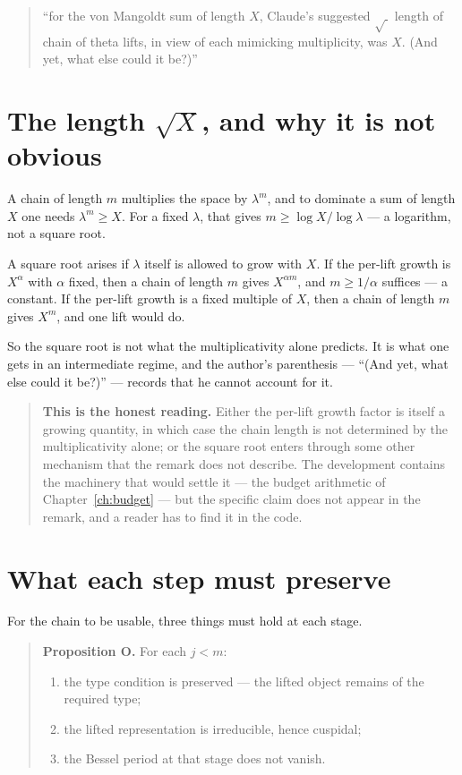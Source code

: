 \begin{quote}
\small
``for the von Mangoldt sum of length $X$, Claude's suggested $\sqrt{\ }$
length of chain of theta lifts, in view of each mimicking multiplicity, was
$X$. (And yet, what else could it be?)''
\end{quote}

\section{The length \texorpdfstring{$\sqrt{X}$}{sqrt of X}, and why it is not obvious}A chain of length $m$ multiplies the space by $\lambda^m$, and to dominate a
sum of length $X$ one needs $\lambda^m \ge X$. For a fixed $\lambda$, that
gives $m \ge \log X / \log \lambda$ --- a logarithm, not a square root.

A square root arises if $\lambda$ itself is allowed to grow with $X$. If the
per-lift growth is $X^{\alpha}$ with $\alpha$ fixed, then a chain of length
$m$ gives $X^{\alpha m}$, and $m \ge 1/\alpha$ suffices --- a constant. If
the per-lift growth is a fixed multiple of $X$, then a chain of length $m$
gives $X^m$, and one lift would do.

So the square root is not what the multiplicativity alone predicts. It is what
one gets in an intermediate regime, and the author's parenthesis --- ``(And
yet, what else could it be?)'' --- records that he cannot account for it.

\begin{quote}
\textbf{This is the honest reading.} Either the per-lift growth factor is
itself a growing quantity, in which case the chain length is not determined by
the multiplicativity alone; or the square root enters through some other
mechanism that the remark does not describe. The development contains the
machinery that would settle it --- the budget arithmetic of
Chapter~\ref{ch:budget} --- but the specific claim does not appear in the
remark, and a reader has to find it in the code.
\end{quote}

\section{What each step must preserve}For the chain to be usable, three things must hold at each stage.

\begin{quote}
\textbf{Proposition O.} For each $j < m$:
\begin{enumerate}
\item the type condition is preserved --- the lifted object remains of the
required type;
\item the lifted representation is irreducible, hence cuspidal;
\item the Bessel period at that stage does not vanish.
\end{enumerate}
\end{quote}

